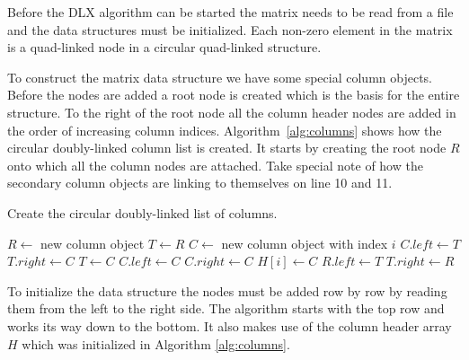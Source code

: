 Before the DLX algorithm can be started the matrix needs to be read from a file and the data structures must be initialized.
Each non-zero element in the matrix is a quad-linked node in a circular quad-linked structure.

To construct the matrix data structure we have some special column objects.
Before the nodes are added a root node is created which is the basis for the entire structure.
To the right of the root node all the column header nodes are added in the order of increasing column indices.
Algorithm~\ref{alg:columns} shows how the circular doubly-linked column list is created.
It starts by creating the root node $R$ onto which all the column nodes are attached.
Take special note of how the secondary column objects are linking to themselves on line 10 and 11.

\begin{algorithm}[H]
	\caption{Create the circular doubly-linked list of columns.}
	\label{alg:columns}
	\begin{distribalgo}[1]
		\STATE $R \leftarrow$ new column object
		\STATE $T \leftarrow R$
			\STATE $C \leftarrow$ new column object with index $i$
				\STATE $C.left \leftarrow T$  
				\STATE $T.right \leftarrow C$
				\STATE $T \leftarrow C$
			\ELSE
				\STATE $C.left \leftarrow C$  
				\STATE $C.right \leftarrow C$
			\ENDIF
			\STATE $H[i] \leftarrow C$
		\ENDFOR
		\STATE $R.left \leftarrow T$
		\STATE $T.right \leftarrow R$
	\end{distribalgo}
\end{algorithm}

To initialize the data structure the nodes must be added row by row by reading them from the left to the right side.
The algorithm starts with the top row and works its way down to the bottom.
It also makes use of the column header array $H$ which was initialized in Algorithm \ref{alg:columns}.


